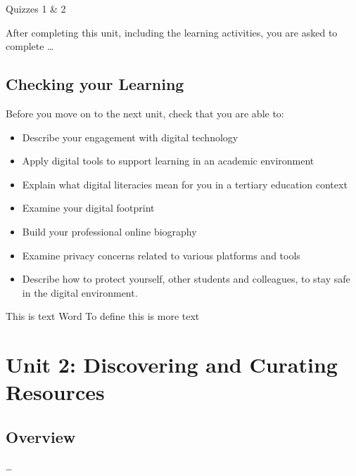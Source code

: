 \documentclass[
]{book}
\providecommand{\tightlist}{%
  \setlength{\itemsep}{0pt}\setlength{\parskip}{0pt}}
\theoremstyle{definition}
\theoremstyle{definition}
\theoremstyle{definition}
\theoremstyle{definition}
\theoremstyle{remark}
\begin{document}
\begin{assessment}
{Quizzes 1 \& 2}

After completing this unit, including the learning activities, you are asked to complete \ldots{}
\end{assessment}

\hypertarget{checking-your-learning}{%
\section*{Checking your Learning}\label{checking-your-learning}}

\begin{progress}
Before you move on to the next unit, check that you are able to:

\begin{itemize}
\tightlist
\item
  Describe your engagement with digital technology
\item
  Apply digital tools to support learning in an academic environment
\item
  Explain what digital literacies mean for you in a tertiary education context
\item
  Examine your digital footprint
\item
  Build your professional online biography
\item
  Examine privacy concerns related to various platforms and tools
\item
  Describe how to protect yourself, other students and colleagues, to stay safe in the digital environment.
\end{itemize}
\end{progress}

This is text Word To define this is more text

\hypertarget{unit-2-discovering-and-curating-resources}{%
\chapter{Unit 2: Discovering and Curating Resources}\label{unit-2-discovering-and-curating-resources}}

\hypertarget{overview-1}{%
\section*{Overview}\label{overview-1}}

\ldots{}
\end{document}
